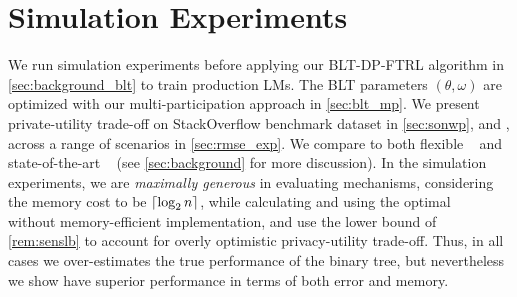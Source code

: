 \section{Simulation Experiments} \label{sec:exp}



We run simulation experiments before applying our BLT-DP-FTRL algorithm in \cref{sec:background_blt} to train production LMs. The BLT parameters $(\theta, \omega)$ are optimized with our multi-participation approach in \cref{sec:blt_mp}. We present private-utility trade-off on StackOverflow benchmark dataset in \cref{sec:sonwp}, and \maxloss, \rmsloss across a range of scenarios in \cref{sec:rmse_exp}. We compare \blts to both flexible \treeagg~\citep{kairouz21practical} and state-of-the-art \bandmf~\citep{choquette2023amplified} (see \cref{sec:background} for more discussion). 
In the simulation experiments, we are \emph{maximally generous} in evaluating \treeagg mechanisms, considering the memory cost to be $\lceil\log_2 n\rceil$, while calculating \rmse and \maxerr using the optimal \tafull~\citep{denisov22matfact} without memory-efficient implementation, and use the lower bound of \cref{rem:senslb} to account for overly optimistic privacy-utility trade-off. Thus, in all cases we over-estimates the true performance of the binary tree, but nevertheless we show \blts have superior performance in terms of both error and memory.

 

    
